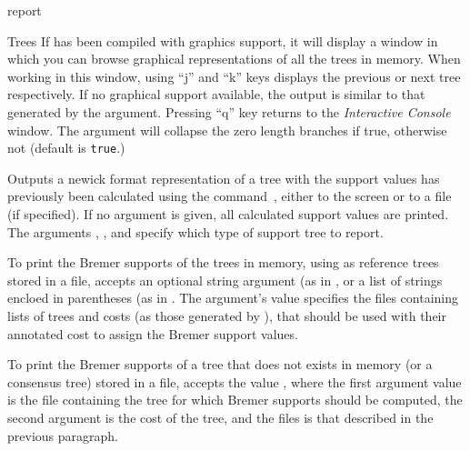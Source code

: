 \begin{command}{report}{}
\begin{arguments}
\begin{argumentgroup}{Trees}
                {If \poy has been compiled with graphics support, it 
                will display a window in which you can
                browse graphical representations of all the trees in memory.
                When working in this window, using ``j'' and ``k'' keys displays the
                previous or next tree respectively. If no graphical support available, the output 
                is similar to that generated by the  argument. Pressing ``q'' key 
                returns to the \emph{Interactive Console} window. The argument
                 will collapse the zero length branches if
                true, otherwise not (default is \texttt{true}.)} 
	     {}

                {Outputs a newick format representation of a tree with the
                support values has previously been calculated using the
                command~,
                either to the screen or to a file (if specified). If no argument
                is given, all calculated support values are printed. The arguments
                , , and
                 specify which type of support tree to
                report. 
                
                To print the Bremer supports of the trees in memory, using as
                reference trees stored in a file, 
                 accepts an optional string argument
                (as in , 
                or a list of strings encloed in parentheses (as in
                . The argument's value specifies the files containing lists of trees and costs (as
                those generated by ), that should be used with
                their annotated cost to assign the Bremer support values. 

                To print the Bremer supports of a tree that does not exists in
                memory (or a consensus tree)
                stored in a file,  accepts the value
                , where the
                first argument value is the file containing the tree for which
                Bremer supports should be computed, the second argument is the
                cost of the tree, and the files is that described in the
                previous paragraph.

}
\end{argumentgroup}
\end{arguments}
\end{command}
